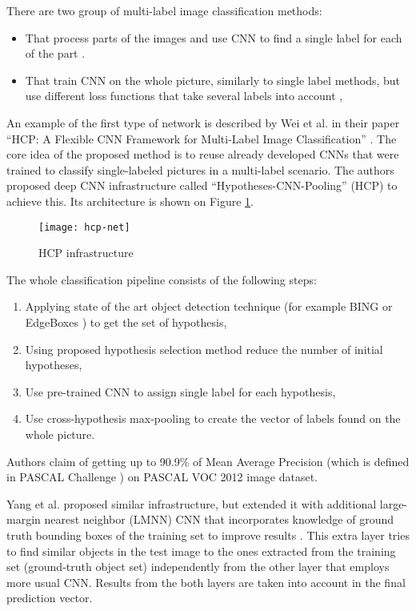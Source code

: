 There are two group of multi-label image classification methods:
\begin{itemize}
    \item That process parts of the images and use CNN to find a single label for each of the part \cite{Wei2016HCP, Yang2015, Ren2016}.
    \item That train CNN on the whole picture, similarly to single label methods, but use different loss functions that take several labels into account \cite{Gong2013DeepRanking},
\end{itemize}

An example of the first type of network is described by Wei et al. in their paper ``HCP: A Flexible CNN Framework for Multi-Label Image Classification''  \cite{Wei2016HCP}. The core idea of the proposed method is to reuse already developed CNNs that were trained to classify single-labeled pictures in a multi-label scenario. The authors proposed deep CNN infrastructure called ``Hypotheses-CNN-Pooling'' (HCP) to achieve this. Its architecture is shown on Figure \ref{fig:hcp-net}.

\begin{figure}[h!]
    \centering
    \texttt{[image: hcp-net]}
    \caption{HCP infrastructure \cite{Wei2016HCP}}
    \label{fig:hcp-net}
\end{figure}

The whole classification pipeline consists of the following steps:
\begin{enumerate}
    \item Applying state of the art object detection technique (for example BING \cite{Cheng2014} or EdgeBoxes \cite{Zitnick2014}) to get the set of hypothesis,
    \item Using proposed hypothesis selection method reduce the number of initial hypotheses,
    \item Use pre-trained CNN to assign single label for each hypothesis,
    \item Use cross-hypothesis max-pooling to create the vector of labels found on the whole picture.
\end{enumerate}

Authors claim of getting up to 90.9\% of Mean Average Precision (which is defined in PASCAL Challenge \cite{Everingham2010PASCAL-VOC}) on PASCAL VOC 2012 image dataset.

Yang et al. proposed similar infrastructure, but extended it with additional large-margin nearest neighbor (LMNN) CNN that incorporates knowledge of ground truth bounding boxes of the training set to improve results  \cite{Yang2015}. This extra layer tries to find similar objects in the test image to the ones extracted from the training set (ground-truth object set) independently from the other layer that employs more usual CNN. Results from the both layers are taken into account in the final prediction vector.

